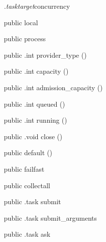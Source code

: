\begin{CrexxClass}{\textit{.tasktarget}}{concurrency}

  \begin{Hierarchy}
  \end{Hierarchy}

  \begin{Members}

    \Factory
      {public}
      {local}
      {}

    \Factory
      {public}
      {process}
      {}

    \Method
      {public}
      {.int}
      {provider\_type}
      {()}

    \Method
      {public}
      {.int}
      {capacity}
      {()}

    \Method
      {public}
      {.int}
      {admission\_capacity}
      {()}

    \Method
      {public}
      {.int}
      {queued}
      {()}

    \Method
      {public}
      {.int}
      {running}
      {()}

    \Method
      {public}
      {.void}
      {close}
      {()}

    \Factory
      {public}
      {default}
      {()}

    \Factory
      {public}
      {failfast}
      {}

    \Factory
      {public}
      {collectall}
      {}

    \Method
      {public}
      {.task}
      {submit}
      {}

    \Method
      {public}
      {.task}
      {submit\_arguments}
      {}

    \Method
      {public}
      {.task}
      {ask}
      {}


\end{Members}
\end{CrexxClass}
